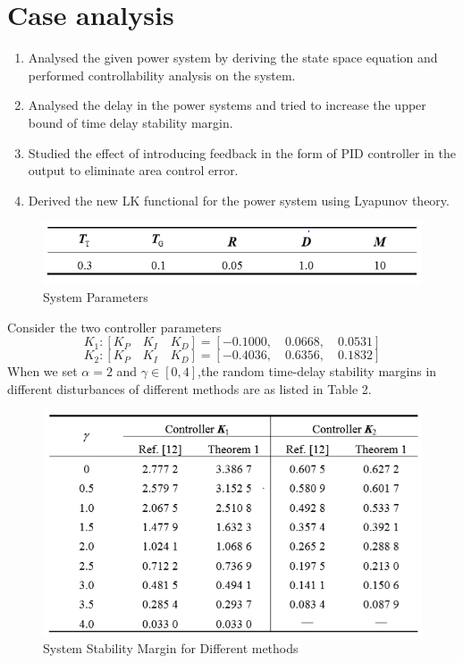 \documentclass[journal]{IEEEtran}
\begin{document}
\section{Case analysis}
\begin{enumerate}
\item Analysed the given power system by deriving the state space equation and performed controllability analysis on the system.
\item  Analysed the delay in the power systems and tried to increase the upper bound of time delay stability margin. 
\item Studied the effect of introducing feedback in the form of PID controller in the output to eliminate area control error.
\item  Derived the new LK functional for the power system using Lyapunov theory.
\end{enumerate}
\begin{figure}[h!]
\includegraphics[width=\linewidth]{systemparameters.png}
  \caption{System Parameters}
  \label{Table1: System Parameters}
\end{figure}
Consider the two controller parameters \\
\begin{equation}
K_1 : [K_P \quad K_I \quad K_D]  = [-0.100 0,\quad 0.066 8, \quad 0.053 1]
\end{equation}
\begin{equation}
K_2 : [K_P \quad K_I \quad K_D]  = [-0.403 6,\quad 0.635 6, \quad 0.183 2]
\end{equation}
When we set $\alpha =2 $ and $\gamma \in [0,4]$,the random time-delay stability margins in different disturbances of different methods are as listed in Table 2. 
\begin{figure}[h!]
\includegraphics[width=\linewidth]{stabilitymargin.png}
  \caption{System Stability Margin for Different methods}
  \label{Table2: System Stability margin for different methods}
\end{figure}
\end{document}
